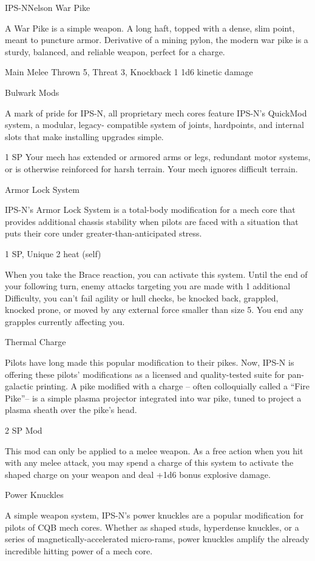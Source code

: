 \begin{mech}{IPS-N}{Nelson}
War Pike

A War Pike is a simple weapon. A long haft, topped with a dense, slim point, meant to puncture armor. Derivative of a mining pylon, the modern war pike is a sturdy, balanced, and reliable weapon, perfect for a charge.

Main Melee
Thrown 5, Threat 3, Knockback 1
1d6 kinetic damage


Bulwark Mods

A mark of pride for IPS-N, all proprietary mech cores feature IPS-N’s QuickMod system, a modular, legacy- compatible system of joints, hardpoints, and internal slots that make installing upgrades simple.

1 SP
Your mech has extended or armored arms or legs, redundant motor systems, or is otherwise reinforced for harsh terrain. Your mech ignores difficult terrain.


Armor Lock System

IPS-N’s Armor Lock System is a total-body modification for a mech core that provides additional chassis stability when pilots are faced with a situation that puts their core under greater-than-anticipated stress.

1 SP, Unique
2 heat (self)

When you take the Brace reaction, you can activate this system. Until the end of your following turn, enemy attacks targeting you are made with 1 additional Difficulty, you can’t fail agility or hull checks, be knocked back, grappled, knocked prone, or moved by any external force smaller than size 5. You end any grapples currently affecting you.


Thermal Charge

Pilots have long made this popular modification to their pikes. Now, IPS-N is offering these pilots’ modifications as a licensed and quality-tested suite for pan-galactic printing. A pike modified with a charge -- often colloquially called a “Fire Pike”-- is a simple plasma projector integrated into war pike, tuned to project a plasma sheath over the pike’s head.

2 SP
Mod

This mod can only be applied to a melee weapon. As a free action when you hit with any melee attack, you may spend a charge of this system to activate the shaped charge on your weapon and deal +1d6 bonus explosive damage.

Power Knuckles

A simple weapon system, IPS-N’s power knuckles are a popular modification for pilots of CQB mech cores. Whether as shaped studs, hyperdense knuckles, or a series of magnetically-accelerated micro-rams, power knuckles amplify the already incredible hitting power of a mech core.


\end{mech}
